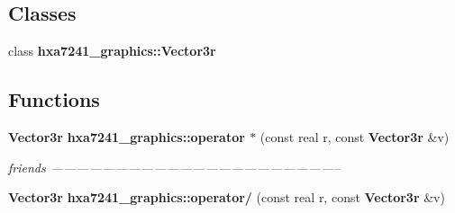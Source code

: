 \subsection*{Classes}
\begin{CompactItemize}
\item 
class {\bf hxa7241\_\-graphics::Vector3r}
\end{CompactItemize}
\subsection*{Functions}
\begin{CompactItemize}
\item 
{\bf Vector3r} {\bf hxa7241\_\-graphics::operator $\ast$} (const real r, const {\bf Vector3r} \&v)
\begin{CompactList}\small\item\em friends -------------------------------------------------------------------- \item\end{CompactList}\item 
{\bf Vector3r} {\bf hxa7241\_\-graphics::operator/} (const real r, const {\bf Vector3r} \&v)
\end{CompactItemize}
